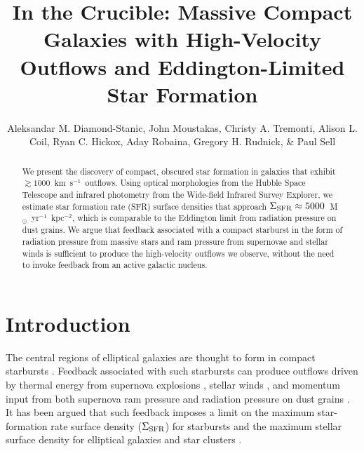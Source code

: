 \documentclass[apj]{emulateapj}
\newcommand{\kms}{km~s$^{-1}$}
\newcommand{\msun}{M$_{\odot}$}
\newcommand{\sigmasfr}{\Sigma_{\textnormal{\scriptsize{SFR}}}}
\begin{document}
\title{In the Crucible: Massive Compact Galaxies with High-Velocity
  Outflows and Eddington-Limited Star Formation}

\author{Aleksandar M. Diamond-Stanic, John
  Moustakas, Christy A. Tremonti,
  Alison L. Coil, Ryan C. Hickox, Aday
  Robaina, Gregory H. Rudnick, \& Paul
  Sell }




\begin{abstract}

We present the discovery of compact, obscured star formation in
galaxies that exhibit $\gtrsim1000$~\kms\ outflows.  Using optical
morphologies from the Hubble Space Telescope and infrared photometry
from the Wide-field Infrared Survey Explorer, we estimate star
formation rate (SFR) surface densities that approach
$\sigmasfr\approx5000$~\msun~yr$^{-1}$~kpc$^{-2}$, which is comparable
to the Eddington limit from radiation pressure on dust grains.  We
argue that feedback associated with a compact starburst in the form of
radiation pressure from massive stars and ram pressure from supernovae
and stellar winds is sufficient to produce the high-velocity outflows
we observe, without the need to invoke feedback from an active
galactic nucleus.

\end{abstract}


\section{Introduction}

The central regions of elliptical galaxies are thought to form in
compact starbursts \citep[e.g.,][]{kor09,hop09}.  Feedback associated
with such starbursts can produce outflows driven by thermal energy
from supernova explosions \citep[e.g.,][]{che85}, stellar winds
\citep[e.g.,][]{lei92}, and momentum input from both supernova ram
pressure and radiation pressure on dust grains \citep[e.g.,][]{mur05}.
It has been argued that such feedback imposes a limit on the maximum
star-formation rate surface density ($\sigmasfr$) for starbursts
\citep[e.g.,][]{leh96,meu97,mur05,tho05} and the maximum stellar
surface density for elliptical galaxies and star clusters
\citep[e.g.,][]{hop10}.
\end{document}
